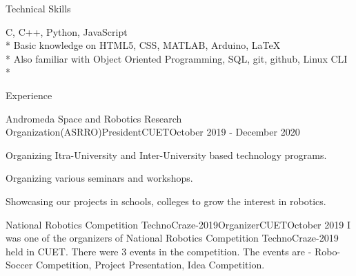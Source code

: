 \documentclass{article}
\newlength{\tabin}
\newlength{\secsep}
\newcommand{\lineunder}{\vspace*{-8pt} \\ \hspace*{-6pt} \hrulefill \\ \vspace*{-15pt}}
\newenvironment{tabbedsection}[1]{
  \begin{list}{}{
      \setlength{\itemsep}{0pt}
      \setlength{\labelsep}{0pt}
      \setlength{\labelwidth}{0pt}
      \setlength{\leftmargin}{\tabin}
      \setlength{\rightmargin}{\tabin}
      \setlength{\listparindent}{0pt}
      \setlength{\parsep}{0pt}
      \setlength{\parskip}{0pt}
      \setlength{\partopsep}{0pt}
      \setlength{\topsep}{#1}
    }
  \item[]
}{\end{list}}
\newenvironment{nospacetabbing}{
    \begin{tabbing}
}{\end{tabbing}\vspace{-1.2em}}
\newenvironment{resume_section}[1]{
  \filbreak
  \vspace{2\secsep}
  \textsc{\large#1}
  \lineunder
  \begin{tabbedsection}{\secsep}
}{\end{tabbedsection}}
\newenvironment{subitems}{
  \renewcommand{\labelitemi}{-}
  \begin{itemize}
      \setlength{\labelsep}{1em}
}{\end{itemize}}
\newenvironment{resume_employer}[4]{
  \vspace{\secsep}
  \textbf{#1} \\ 
  \indent {\small #2} \hfill {\footnotesize#3 (#4)}
  \begin{tabbedsection}{0pt}
  \begin{subitems}
}{\end{subitems}\end{tabbedsection}}
\begin{document}


\begin{resume_section}{Technical Skills}
  \begin{nospacetabbing}
  C, C++, Python, JavaScript\\*
  Basic knowledge on HTML5, CSS, MATLAB, Arduino, \LaTeX\\*
  Also familiar with Object Oriented Programming, SQL, git, github, Linux CLI\\*
  \end{nospacetabbing}
\end{resume_section}%


\begin{resume_section}{Experience}
  \begin{resume_employer}{Andromeda Space and Robotics Research Organization(ASRRO)}{President}{CUET}{October 2019 - December 2020}
    \item Organizing Itra-University and Inter-University based technology programs.
    \item Organizing various seminars and workshops.
    \item Showcasing our projects in schools, colleges to grow the interest in robotics.
  \end{resume_employer}
  
  \begin{resume_employer}{National Robotics Competition TechnoCraze-2019}{Organizer}{CUET}{October 2019}
    I was one of the organizers of National Robotics Competition TechnoCraze-2019 held in CUET. There were 3 events in the competition. The events are - Robo-Soccer Competition, Project Presentation, Idea Competition.
  \end{resume_employer}
\end{resume_section}%


\end{document}
